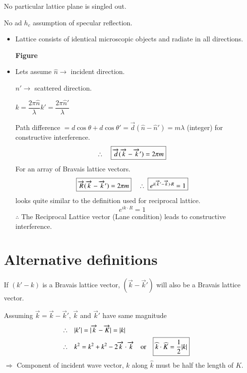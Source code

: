 No particular lattice plane is singled out.

No ad $h_{c}$ assumption of specular reflection.
\begin{itemize}
\item Lattice consists of identical microscopic objects and radiate in all directions.
\begin{center}
{\bf Figure}
\end{center}

\item Lets assume $\widehat{n}\to$ incident direction.

$\widehat{n}'\to$ scattered direction.

$k=\dfrac{2\pi\widehat{n}}{\lambda}$\quad $k'=\dfrac{2\pi\widehat{n}'}{\lambda}$

Path difference $=d\cos\theta+d\cos \theta'=\overrightarrow{d}(\widehat{n}-\widehat{n}')=m\lambda$ (integer) for constructive interference.
$$
\therefore\quad \fbox{$\overrightarrow{d}(\overrightarrow{k}-\overrightarrow{k}')=2\pi m$}
$$
For an array of Bravais lattice vectors.
$$
\fbox{$\overrightarrow{R}(\overrightarrow{k}-\overrightarrow{k}')=2\pi m$}\quad \therefore \ \fbox{$e^{i(\overrightarrow{k}'-\overrightarrow{k})\cdot R}=1$}
$$
looks quite similar to the definition used for reciprocal lattice.
$$
e^{ik\cdot R}=1
$$
$\therefore$ The Reciprocal Lattice vector  (Lane condition) leads to constructive interference.
\end{itemize}

\section*{Alternative definitions}

If $(k'-k)$ is a Bravais lattice vector, $(\overrightarrow{k}-\overrightarrow{k}')$ will also be a Bravais lattice vector.

Assuming $\overrightarrow{k}=\overrightarrow{k}-\overrightarrow{k}'$, $\overrightarrow{k}$ and $\overrightarrow{k}'$ have same magnitude 
\begin{align*}
\therefore\quad & |k'|=|\overrightarrow{k}-\overrightarrow{K}|=|k|\\
\therefore\quad & k^{2}=k^{2}+k^{2}-2\overrightarrow{k}\cdot \overrightarrow{k}\quad \text{or}\quad \fbox{$\widehat{k}\cdot \widehat{K}=\dfrac{1}{2}|k|$}
\end{align*}
$\Rightarrow$ Component of incident wave vector, $k$ along $\widehat{k}$ must be half the length of $K$.


